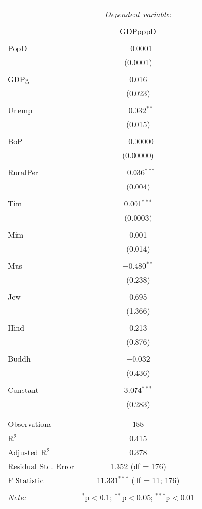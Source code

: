 \documentclass[12pt,english]{article}
\begin{document}
\begin{table}[!htbp] \centering 
  \caption{} 
  \label{tab2} 
\begin{tabular}{@{\extracolsep{5pt}}lc} 
\\[-1.8ex]\hline 
\hline \\[-1.8ex] 
 & \multicolumn{1}{c}{\textit{Dependent variable:}} \\ 
\cline{2-2} 
\\[-1.8ex] & GDPpppD \\ 
\hline \\[-1.8ex] 
 PopD & $-$0.0001 \\ 
  & (0.0001) \\ 
  & \\ 
 GDPg & 0.016 \\ 
  & (0.023) \\ 
  & \\ 
 Unemp & $-$0.032$^{**}$ \\ 
  & (0.015) \\ 
  & \\ 
 BoP & $-$0.00000 \\ 
  & (0.00000) \\ 
  & \\ 
 RuralPer & $-$0.036$^{***}$ \\ 
  & (0.004) \\ 
  & \\ 
 Tim & 0.001$^{***}$ \\ 
  & (0.0003) \\ 
  & \\ 
 Mim & 0.001 \\ 
  & (0.014) \\ 
  & \\ 
 Mus & $-$0.480$^{**}$ \\ 
  & (0.238) \\ 
  & \\ 
 Jew & 0.695 \\ 
  & (1.366) \\ 
  & \\ 
 Hind & 0.213 \\ 
  & (0.876) \\ 
  & \\ 
 Buddh & $-$0.032 \\ 
  & (0.436) \\ 
  & \\ 
 Constant & 3.074$^{***}$ \\ 
  & (0.283) \\ 
  & \\ 
\hline \\[-1.8ex] 
Observations & 188 \\ 
R$^{2}$ & 0.415 \\ 
Adjusted R$^{2}$ & 0.378 \\ 
Residual Std. Error & 1.352 (df = 176) \\ 
F Statistic & 11.331$^{***}$ (df = 11; 176) \\ 
\hline 
\hline \\[-1.8ex] 
\textit{Note:}  & \multicolumn{1}{r}{$^{*}$p$<$0.1; $^{**}$p$<$0.05; $^{***}$p$<$0.01} \\ 
\end{tabular} 
\end{table}
\end{document}
